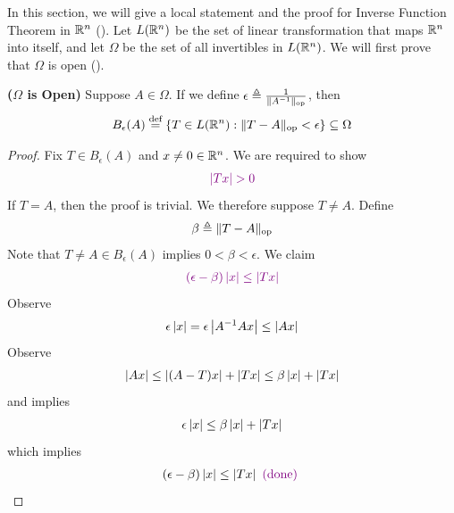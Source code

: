 \documentclass{report}
\begin{document}
\begin{mdframed}
In this section, we will give a local statement and the proof for Inverse Function Theorem in  $\mathbb{R}^n$ ().  Let $L(\mathbb{R}^n)$ be the set of linear transformation that maps $\mathbb{R}^n$ into itself, and let $\Omega$ be the set of all invertibles in $L(\mathbb{R}^n)$. We will first prove that  $\Omega$ is open (). 
\end{mdframed}
\begin{theorem}
\label{SCftI}
\textbf{($\Omega$ is Open)} Suppose $A\in \Omega$. If we define $\epsilon \triangleq \frac{1}{\| A^{-1} \|_\text{op}}$, then  
\begin{align*}
B_\epsilon (A) \overset{\text{def}}{=}\{ T \in L(\mathbb{R}^n): \| T-A \|_\text{op}< \epsilon  \}\subseteq \Omega
\end{align*}
\end{theorem}
\begin{proof}
Fix $T \in B_\epsilon (A)$ and $x\neq 0\in\mathbb{R}^n$. We are required to show 
\begin{align*}
\vi{\abso{Tx}>0}
\end{align*}
If $T=A$, then the proof is trivial. We therefore suppose $T\neq A$. Define 
\begin{align*}
\beta \triangleq \| T-A \|_\text{op}
\end{align*}
Note that $T\neq A\in B_\epsilon (A)$ implies $0<\beta < \epsilon  $. We claim 
\begin{align*}
  \textcolor{violet}{(\epsilon  -\beta )\left|x\right|\leq \left|Tx\right|}
\end{align*}
Observe 
\begin{align}
\label{Obe1}
\epsilon  \left|x\right|= \epsilon  \left|A^{-1}Ax\right|\leq \left|Ax\right|
\end{align}
Observe 
\begin{align}
\label{Obe2}
\left|Ax\right|\leq \left|(A-T)x\right|+\left|Tx\right|\leq \beta \left|x\right|+ \left|Tx\right|
\end{align}
 and  implies 
\begin{align*}
\epsilon  \left|x\right|\leq \beta \left|x\right|+ \left|Tx\right|
\end{align*}
which implies 
\begin{align*}
  (\epsilon  -\beta  )\left|x\right|\leq \left|Tx\right| \textcolor{violet}{\text{ (done) }}
\end{align*}
\end{proof}
\end{document}
